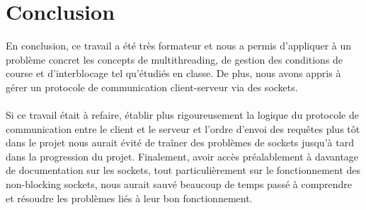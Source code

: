\documentclass[11pt]{article}
\begin{document}
\section*{ Conclusion }
\setlength{\parindent}{20pt}
En conclusion, ce travail a été très formateur et nous a permis d’appliquer à un problème concret les concepts de multithreading, de gestion des 
conditions de course et d’interblocage tel qu’étudiés en classe. De plus, nous avons appris à gérer un protocole de communication client-serveur 
via des sockets.\\ 
\\
Si ce travail était à refaire, établir plus rigoureusement la logique du protocole de communication entre le client et le serveur et l’ordre 
d’envoi des requêtes plus tôt dans le projet nous aurait évité de traîner des problèmes de sockets jusqu’à tard dans la progression du projet.  
Finalement, avoir accès préalablement à davantage de documentation sur les sockets, tout particulièrement sur le fonctionnement des non-blocking 
sockets, nous aurait sauvé beaucoup de temps passé à comprendre et résoudre les problèmes liés à leur bon fonctionnement.\\
\end{document}

